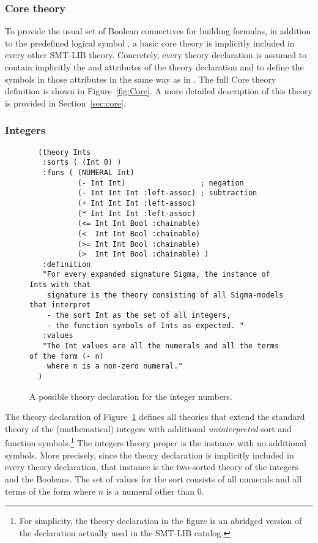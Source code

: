 \subsubsection*{Core theory}

To provide the usual set of Boolean connectives for building formulas,
in addition to the predefined logical symbol ,
a basic core theory is implicitly included in every other SMT-LIB theory.
Concretely, every theory declaration is assumed 
to contain implicitly the  and  attributes 
of the  theory declaration and 
to define the symbols in those attributes in the same way as in .
The full Core theory definition is shown in Figure~\ref{fig:Core}.
A more detailed description of this theory is provided in Section~\ref{sec:core}.


\subsubsection*{Integers}

\begin{figure}[t]
  \small
  {\color{NavyBlue}
  \begin{verbatim}
  (theory Ints
   :sorts ( (Int 0) )
   :funs ( (NUMERAL Int) 
           (- Int Int)                 ; negation
           (- Int Int Int :left-assoc) ; subtraction
           (+ Int Int Int :left-assoc) 
           (* Int Int Int :left-assoc)
           (<= Int Int Bool :chainable)
           (<  Int Int Bool :chainable)
           (>= Int Int Bool :chainable)
           (>  Int Int Bool :chainable) )
   :definition 
   "For every expanded signature Sigma, the instance of Ints with that
    signature is the theory consisting of all Sigma-models that interpret 
    - the sort Int as the set of all integers,
    - the function symbols of Ints as expected. "
   :values 
   "The Int values are all the numerals and all the terms of the form (- n)
    where n is a non-zero numeral." 
  )
  \end{verbatim}
  }
  \caption{A possible theory declaration for the integer numbers.}
  \label{fig:Integers}
\end{figure}
  
The theory declaration of Figure~\ref{fig:Integers} defines all theories
that extend the standard theory of the (mathematical) integers with additional 
\emph{uninterpreted} sort and function symbols.\footnote{%
For simplicity, the theory declaration in the figure is an abridged version of 
the declaration actually used in the SMT-LIB catalog.
}
The integers theory proper is the instance with no additional symbols.
More precisely,
since the  theory declaration is implicitly included in
every theory declaration,
that instance is the two-sorted theory of the integers and the Booleans.
The set of values for the  sort consists of all numerals and 
all terms of the form 
where $n$ is a numeral other than $0$.


